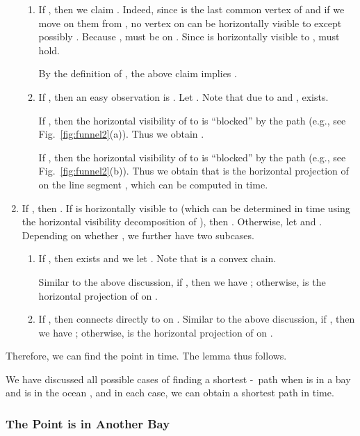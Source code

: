 \documentclass[english,runningheads,11pt]{llncs}
\def\st{-}
\newenvironment{proof}{\noindent {\textbf{Proof:}}\rm}{\hfill \rm}
\begin{document}
\begin{proof}
\begin{enumerate}
\begin{enumerate}
\item If , then we claim . Indeed, since  is the last common vertex
of  and  if we move on them from , no vertex on
 can be horizontally visible to  except possibly .
Because ,  must be on . Since  is
horizontally visible to ,  must hold.

    By the definition of , the above claim implies .

\item If , then an easy observation is . Let . Note that due to  and ,  exists.

    If , then the horizontal visibility of  to  is ``blocked'' by the
path  (e.g., see Fig.~\ref{fig:funnel2}(a)). Thus we obtain .

    If , then the horizontal visibility of  to  is ``blocked'' by
the path  (e.g., see Fig.~\ref{fig:funnel2}(b)). Thus we obtain that  is
the horizontal projection of  on the line segment , which can be computed in  time.
\end{enumerate}

\item
If , then .
If  is horizontally visible to  (which can be determined in  time
using the horizontal visibility decomposition of ), then .  Otherwise,
let  and . Depending on whether , we further have two subcases.

\begin{enumerate}
\item If , then  exists and we let .
Note that  is a convex chain.


    Similar to the above discussion, if , then we have ; otherwise,  is the horizontal projection of  on .

\item
If , then  connects directly to  on .
Similar to the above discussion, if , then we have ; otherwise,  is the horizontal projection of  on .
\end{enumerate}
\end{enumerate}

Therefore, we can find the point  in  time. The lemma thus follows.
\end{proof}


We have discussed all possible cases of finding a shortest \st\ path
when  is in a bay  and  is in the ocean , and in each case,
we can obtain a shortest path in  time.

\subsubsection{The Point  is in Another Bay}
\end{document}
